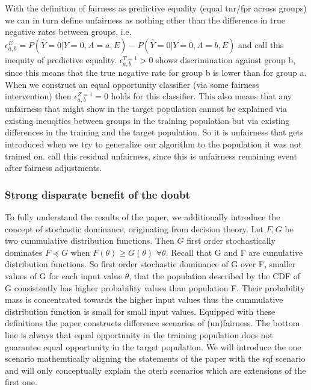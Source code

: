 With the definition of fairness as predictive equality (equal tnr/fpr across groups) we can in turn define unfairness as nothing other than the difference in true negative rates between groups, i.e. \(\epsilon_{a,b}^E = P(\hat{Y} = 0 | Y = 0, A = a, E) - P(\hat{Y} = 0 | Y = 0, A = b, E)\) and call this inequity of predictive equality. $\epsilon_{a,b}^{T=1} > 0$ shows discrimination against group b, since this means that the true negative rate for group b is lower than for group a.
When we construct an equal opportunity classifier (via some fairness intervention) then $\epsilon_{a,b}^{Z=1} = 0$ holds for this classifier. This also means that any unfairness that might show in the target population cannot be explained via existing ineuqities between groups in the training population but via existing differences in the training and the target population. So it is unfairness that gets introduced when we try to generalize our algorithm to the population it was not trained on. \cite{kallus} call this residual unfairness, since this is unfairness remaining event after fairness adjustments.

\subsubsection*{Strong disparate benefit of the doubt}
To fully understand the results of the paper, we additionally introduce the concept of stochastic dominance, originating from decision theory. Let $F, G$ be two cummulative distribution functions. Then $G$ first order stochastically dominates $F \preceq G$ when $F(\theta) \geq G(\theta)$ $\forall\theta$. Recall that G and F are cumulative distribution functions. So first order stochastic dominance of G over F, smaller values of G for each input value $\theta$, that the population described by the CDF of G consistently has higher probability values than population F. Their probability mass is concentrated towards the higher input values thus the cummulative distribution function is small for small input values.
Equipped with these definitions the paper constructs difference scenarios of (un)fairness. The bottom line is always that equal opportunity in the training population does not guarantee equal opportunity in the target population. We will introduce the one scenario mathemtically aligning the statements of the paper with the sqf scenario and will only conceptually explain the oterh scenarios which are extensions of the first one.

